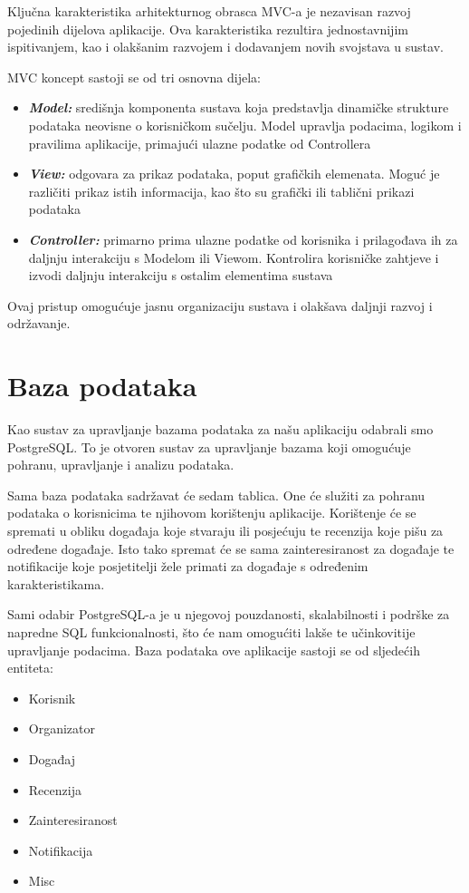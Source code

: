 	Ključna karakteristika arhitekturnog obrasca MVC-a je nezavisan razvoj pojedinih dijelova aplikacije. Ova karakteristika rezultira jednostavnijim ispitivanjem, kao i olakšanim razvojem i dodavanjem novih svojstava u sustav.
	
	MVC koncept sastoji se od tri osnovna dijela:
	
	\begin{itemize}
		\item 	\textit{\textbf{Model:}}	središnja komponenta sustava koja predstavlja dinamičke strukture podataka neovisne o korisničkom sučelju. Model upravlja podacima, logikom i pravilima aplikacije, primajući ulazne podatke od Controllera
		\item 	\textit{\textbf{View:}}	odgovara za prikaz podataka, poput grafičkih elemenata. Moguć je različiti prikaz istih informacija, kao što su grafički ili tablični prikazi podataka
		\item 	\textit{\textbf{Controller:}} primarno prima ulazne podatke od korisnika i prilagođava ih za daljnju interakciju s Modelom ili Viewom. Kontrolira korisničke zahtjeve i izvodi daljnju interakciju s ostalim elementima sustava
	\end{itemize}
	
	Ovaj pristup omogućuje jasnu organizaciju sustava i olakšava daljnji razvoj i održavanje.

		

				
		\section{Baza podataka}
			
			
		Kao sustav za upravljanje bazama podataka za našu aplikaciju odabrali smo PostgreSQL. To je otvoren sustav za upravljanje bazama koji omogućuje pohranu, upravljanje i analizu podataka.
			
		Sama baza podataka sadržavat će sedam tablica. One će služiti za pohranu podataka o korisnicima te njihovom korištenju aplikacije. Korištenje će se spremati u obliku događaja koje stvaraju ili posjećuju te recenzija koje pišu za određene događaje. Isto tako spremat će se sama zainteresiranost za događaje te notifikacije koje posjetitelji žele primati za događaje s određenim karakteristikama.
			
		Sami odabir PostgreSQL-a je u njegovoj pouzdanosti, skalabilnosti i podrške za napredne SQL funkcionalnosti, što će nam omogućiti lakše te učinkovitije upravljanje podacima.
			Baza podataka ove aplikacije sastoji se od sljedećih entiteta: 
			\begin{itemize}
			\item 	Korisnik
			\item 	Organizator	
			\item 	Događaj
			\item 	Recenzija
			\item 	Zainteresiranost
			\item 	Notifikacija
			\item 	Misc
		\end{itemize}
		
